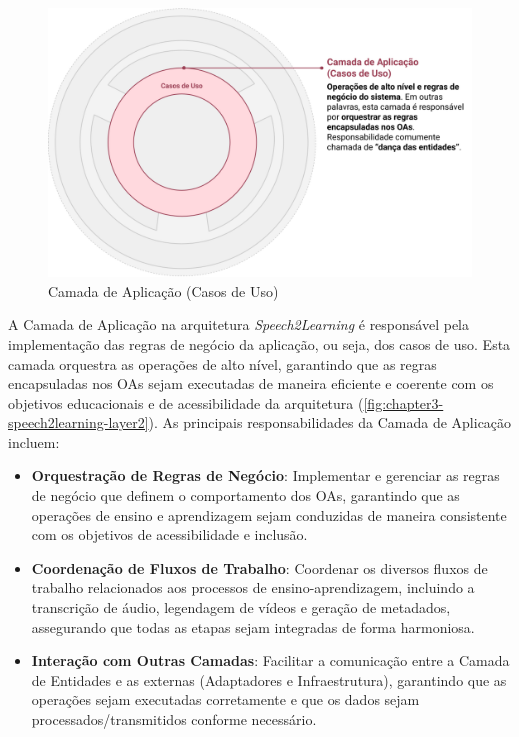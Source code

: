 \begin{figure}[htb]
\centering
\caption{Camada de Aplicação (Casos de Uso)}
\label{fig:chapter3-speech2learning-layer2}
\includegraphics[width=1\textwidth]{images/chapter3-speech2learning-layer2.png}
\end{figure}

A Camada de Aplicação na arquitetura \textit{Speech2Learning} é responsável pela implementação das regras de negócio da aplicação, ou seja, dos casos de uso. Esta camada orquestra as operações de alto nível, garantindo que as regras encapsuladas nos OAs sejam executadas de maneira eficiente e coerente com os objetivos educacionais e de acessibilidade da arquitetura (\autoref{fig:chapter3-speech2learning-layer2}). As principais responsabilidades da Camada de Aplicação incluem:

\begin{itemize}
    \item \textbf{Orquestração de Regras de Negócio}: Implementar e gerenciar as regras de negócio que definem o comportamento dos OAs, garantindo que as operações de ensino e aprendizagem sejam conduzidas de maneira consistente com os objetivos de acessibilidade e inclusão.

    \item \textbf{Coordenação de Fluxos de Trabalho}: Coordenar os diversos fluxos de trabalho relacionados aos processos de ensino-aprendizagem, incluindo a transcrição de áudio, legendagem de vídeos e geração de metadados, assegurando que todas as etapas sejam integradas de forma harmoniosa.

    \item \textbf{Interação com Outras Camadas}: Facilitar a comunicação entre a Camada de Entidades e as externas (Adaptadores e Infraestrutura), garantindo que as operações sejam executadas corretamente e que os dados sejam processados/transmitidos conforme necessário.
\end{itemize}

